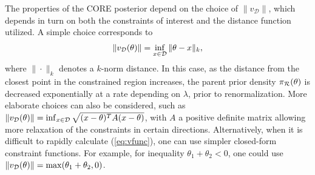\documentclass[10pt,fleqn]{article}
\DeclareMathOperator{\1}{\mathbbm{1}} \DeclareMathOperator{\bigO}{\mc O}
\begin{document}
The properties of the CORE posterior depend on the choice of $\|v_{\mathcal D}\|$, which depends in turn on both the constraints of interest and the distance function utilized.  A simple choice corresponds to 
\begin{eqnarray}
\|v_{\mathcal{D}}(\theta)\| = \inf_{x\in\mathcal{D}} \|\theta-x\|_k, \label{eq:vfunc}
\end{eqnarray}
where $\|\cdot\|_k$ denotes a $k$-norm distance.  In this case, as the distance from the closest point in the constrained region increases, the parent prior density $\pi_{\mathcal{R}}(\theta)$ is decreased exponentially at a rate depending on $\lambda$, prior to renormalization.  More elaborate choices can also be considered, such as $\|v_{\mathcal{D}}(\theta)\| = \inf_{x\in\mathcal{D}}\sqrt{(x-\theta)^T A (x-\theta)}$, with $A$ a positive definite matrix allowing more relaxation of the constraints in certain directions.  Alternatively, when it is difficult to rapidly calculate (\ref{eq:vfunc}), one can use simpler closed-form constraint functions.   
For example, for inequality $\theta_1+\theta_2<0$, one could use $\|v_{\mathcal{D}}(\theta)\|=\max(\theta_1+\theta_2,0)$. 
\end{document}
